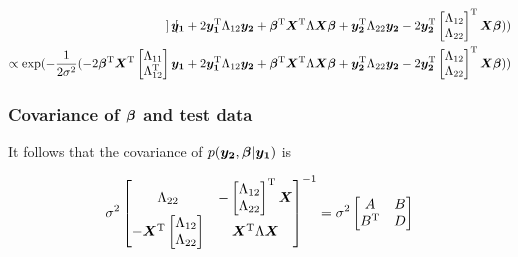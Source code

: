 \documentclass[twoside]{article}
\begin{document}
\begin{align*}
\begin{bmatrix}
\end{bmatrix}
\bm{y_1} 
+
2
\bm{y_1}^\mathrm{T} 
\Lambda_{12}
\bm{y_2}
+
\bm{\beta}^\mathrm{T}\bm{X}^\mathrm{T} 
\Lambda
\bm{X}\bm{\beta}
+
\bm{y_2}^\mathrm{T} 
\Lambda_{22}
\bm{y_2}
-
2
\bm{y_2}^\mathrm{T}
\begin{bmatrix} 
\Lambda_{12} \\
\Lambda_{22}
\end{bmatrix}^\mathrm{T}
\bm{X}\bm{\beta}
)
)
\\
\propto
\exp(
-\frac{1}{2\sigma^2}
( 
-
2
\bm{\beta}^\mathrm{T}\bm{X}^\mathrm{T} 
\begin{bmatrix}
\Lambda_{11} \\ \Lambda_{12}^\mathrm{T}
\end{bmatrix}
\bm{y_1} 
+
2
\bm{y_1}^\mathrm{T} 
\Lambda_{12}
\bm{y_2}
+
\bm{\beta}^\mathrm{T}\bm{X}^\mathrm{T} 
\Lambda
\bm{X}\bm{\beta}
+
\bm{y_2}^\mathrm{T} 
\Lambda_{22}
\bm{y_2}
-
2
\bm{y_2}^\mathrm{T}
\begin{bmatrix} 
\Lambda_{12} \\
\Lambda_{22}
\end{bmatrix}^\mathrm{T}
\bm{X}\bm{\beta}
)
)
\end{align*}

\subsubsection{Covariance of $\bm{\beta}$ and test data}
It follows that the covariance of $p(\bm{y_2},\bm{\beta}|\bm{y_1})$ is

\begin{align}
\sigma^2
\begin{bmatrix}
\Lambda_{22} 
& 
-\begin{bmatrix} 
\Lambda_{12} \\
\Lambda_{22}
\end{bmatrix}^\mathrm{T}
\bm{X}
\\
-\bm{X}^\mathrm{T}
\begin{bmatrix} 
\Lambda_{12} \\
\Lambda_{22}
\end{bmatrix}
&
\bm{X}^\mathrm{T}\Lambda\bm{X}
\end{bmatrix}^{-1}
=
\sigma^2
\begin{bmatrix}
A
& 
B
\\
B^\mathrm{T}
&
D
\end{bmatrix}
\end{align}

\end{document}
